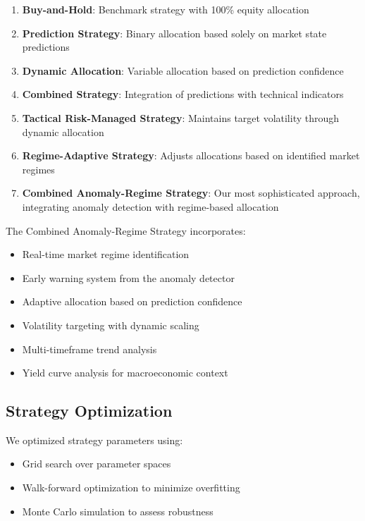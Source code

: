 \documentclass[10pt]{article}
\begin{document}
\begin{enumerate}
    \item \textbf{Buy-and-Hold}: Benchmark strategy with 100\% equity allocation
    
    \item \textbf{Prediction Strategy}: Binary allocation based solely on market state predictions
    
    \item \textbf{Dynamic Allocation}: Variable allocation based on prediction confidence
    
    \item \textbf{Combined Strategy}: Integration of predictions with technical indicators
    
    \item \textbf{Tactical Risk-Managed Strategy}: Maintains target volatility through dynamic allocation
    
    \item \textbf{Regime-Adaptive Strategy}: Adjusts allocations based on identified market regimes
    
    \item \textbf{Combined Anomaly-Regime Strategy}: Our most sophisticated approach, integrating anomaly detection with regime-based allocation
\end{enumerate}

The Combined Anomaly-Regime Strategy incorporates:
\begin{itemize}
    \item Real-time market regime identification
    \item Early warning system from the anomaly detector
    \item Adaptive allocation based on prediction confidence
    \item Volatility targeting with dynamic scaling
    \item Multi-timeframe trend analysis
    \item Yield curve analysis for macroeconomic context
\end{itemize}

\subsection{Strategy Optimization}
We optimized strategy parameters using:
\begin{itemize}
    \item Grid search over parameter spaces
    \item Walk-forward optimization to minimize overfitting
    \item Monte Carlo simulation to assess robustness
\end{itemize}
\end{document}
